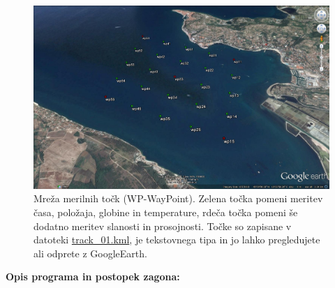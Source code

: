 \begin{figure}[!h]
	\centering \includegraphics[width=12cm]{Vaje/KartGlobSlan/figs/track_01_02.jpg}
	\caption{Mreža merilnih točk (WP-WayPoint). Zelena točka pomeni meritev časa, položaja, globine in temperature, rdeča točka pomeni še dodatno meritev slanosti in prosojnosti. Točke so zapisane v datoteki \href{https://drive.google.com/open?id=0B1dT-CBA07ANWDI0dDdkc1p1TkU}{track\_01.kml}, je tekstovnega tipa in jo lahko pregledujete ali odprete z GoogleEarth.}
	\label{fig:v_est_wps}
\end{figure}

\newpage
\noindent
\textbf{Opis programa in postopek zagona:}
\vspace*{5mm}

